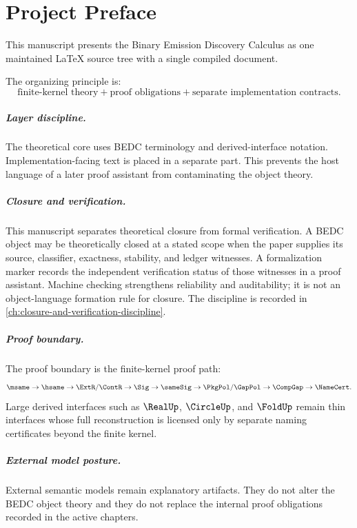 
\chapter*{Project Preface}
This manuscript presents the Binary Emission Discovery Calculus as one maintained LaTeX source tree with a single compiled document.

The organizing principle is:
$$
\text{finite-kernel theory} + \text{proof obligations} + \text{separate implementation contracts}.
$$

\paragraph{Layer discipline.}
The theoretical core uses BEDC terminology and derived-interface notation. Implementation-facing text is placed in a separate part. This prevents the host language of a later proof assistant from contaminating the object theory.

\paragraph{Closure and verification.}
This manuscript separates theoretical closure from formal verification. A BEDC object may be theoretically closed at a stated scope when the paper supplies its source, classifier, exactness, stability, and ledger witnesses. A formalization marker records the independent verification status of those witnesses in a proof assistant. Machine checking strengthens reliability and auditability; it is not an object-language formation rule for closure. The discipline is recorded in \autoref{ch:closure-and-verification-discipline}.

\paragraph{Proof boundary.}
The proof boundary is the finite-kernel proof path:
$$
\msame\to \hsame\to \ExtR/\ContR\to \Sig\to \sameSig\to \PkgPol/\GapPol\to \CompGap\to \NameCert.
$$
Large derived interfaces such as $\RealUp$, $\CircleUp$, and $\FoldUp$ remain thin interfaces whose full reconstruction is licensed only by separate naming certificates beyond the finite kernel.

\paragraph{External model posture.}
External semantic models remain explanatory artifacts. They do not alter the BEDC object theory and they do not replace the internal proof obligations recorded in the active chapters.
